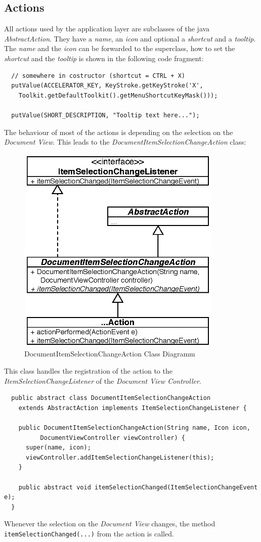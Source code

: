 \subsection{Actions}
All actions used by the application layer are subclasses of the java \textit{AbstractAction}. They have a \textit{name}, an \textit{icon} and optional a \textit{shortcut} and a \textit{tooltip}. The \textit{name} and the \textit{icon} can be forwarded to the superclass, how to set the \textit{shortcut} and the \textit{tooltip} is shown in the following code fragment:
\begin{verbatim}
  // somewhere in costructor (shortcut = CTRL + X)
  putValue(ACCELERATOR_KEY, KeyStroke.getKeyStroke('X',
    Toolkit.getDefaultToolkit().getMenuShortcutKeyMask()));

  putValue(SHORT_DESCRIPTION, "Tooltip text here...");
\end{verbatim}
The behaviour of most of the actions is depending on the selection on the \textit{Document View}. This leads to the \textit{DocumentItemSelectionChangeAction} class:
\begin{figure}[H]
\begin{center}
  \includegraphics[height=3.97in, width=3.85in]{../images/finalreport/application_action.eps}
\caption{DocumentItemSelectionChangeAction Class Diagramm}
\label{application_application_action}
\end{center}
\end{figure}
This class handles the registration of the action to the \textit{ItemSelectionChangeListener} of  the \textit{Document View Controller}.
\begin{verbatim}
  public abstract class DocumentItemSelectionChangeAction
    extends AbstractAction implements ItemSelectionChangeListener {
  
    public DocumentItemSelectionChangeAction(String name, Icon icon,
          DocumentViewController viewController) {
      super(name, icon);
      viewController.addItemSelectionChangeListener(this);
    }
    
    public abstract void itemSelectionChanged(ItemSelectionChangeEvent e);
  }
\end{verbatim}
Whenever the selection on the \textit{Document View} changes, the method \texttt{itemSelectionChanged(...)} from the action is called.


